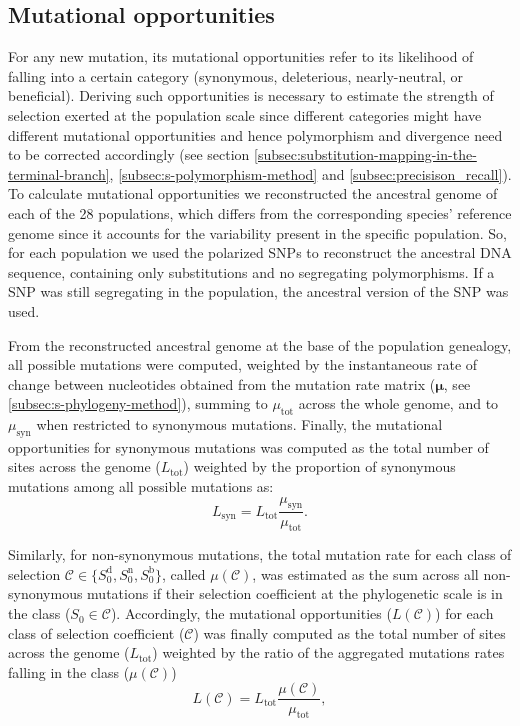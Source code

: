 \documentclass{article}
\newcommand{\UniDimArray}[1]{\bm{#1}}
\newcommand{\Sphy}{S_{0}}
\newcommand{\Sphyclass}{\mathcal{C}}
\begin{document}
    \subsection{Mutational opportunities}
    \label{subsec:nunber-of-sites}
    For any new mutation, its mutational opportunities refer to its likelihood of falling into a certain category (synonymous, deleterious, nearly-neutral, or beneficial).
    Deriving such opportunities is necessary to estimate the strength of selection exerted at the population scale since different categories might have different mutational opportunities and hence polymorphism and divergence need to be corrected accordingly (see section \ref{subsec:substitution-mapping-in-the-terminal-branch}, \ref{subsec:s-polymorphism-method} and \ref{subsec:precisison_recall}).
    To calculate mutational opportunities we reconstructed the ancestral genome of each of the 28 populations, which differs from the corresponding species' reference genome since it accounts for the variability present in the specific population.
    So, for each population we used the polarized SNPs to reconstruct the ancestral DNA sequence, containing only substitutions and no segregating polymorphisms.
    If a SNP was still segregating in the population, the ancestral version of the SNP was used.

    From the reconstructed ancestral genome at the base of the population genealogy, all possible mutations were computed, weighted by the instantaneous rate of change between nucleotides obtained from the mutation rate matrix ($\UniDimArray{\mu}$, see \ref{subsec:s-phylogeny-method}), summing to $\mu_{\text{tot}}$ across the whole genome, and to $\mu_{\text{syn}}$ when restricted to synonymous mutations.
    Finally, the mutational opportunities for synonymous mutations was computed as the total number of sites across the genome ($L_{\text{tot}}$) weighted by the proportion of synonymous mutations among all possible mutations as:
    \begin{equation}
        L_{\text{syn}} = L_{\text{tot}} \frac{\mu_{\text{syn}}}{\mu_{\text{tot}}}.
    \end{equation}

    Similarly, for non-synonymous mutations, the total mutation rate for each class of selection $\Sphyclass \in \{\Sphy^{\text{d}}, \Sphy^{\text{n}}, \Sphy^{\text{b}} \}$, called $\mu\left( \Sphyclass \right)$, was estimated as the sum across all non-synonymous mutations if their selection coefficient at the phylogenetic scale is in the class ($\Sphy \in \Sphyclass$).
    Accordingly, the mutational opportunities ($L \left( \Sphyclass \right)$) for each class of selection coefficient ($\Sphyclass$) was finally computed as the total number of sites across the genome ($L_{\text{tot}}$) weighted by the ratio of the aggregated mutations rates falling in the class ($\mu\left( \Sphyclass \right)$)
    \begin{equation}
        L \left( \Sphyclass \right) = L_{\text{tot}} \frac{\mu\left( \Sphyclass \right)}{\mu_{\text{tot}}},
    \end{equation}
\end{document}
